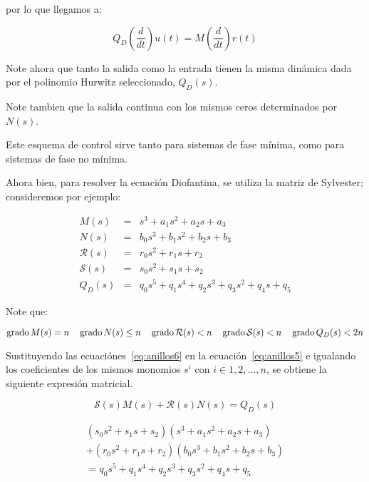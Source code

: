             por lo que llegamos a:

            \begin{equation}
                Q_D \left( \frac{d}{dt} \right) u(t) = M \left( \frac{d}{dt} \right) r(t)
            \end{equation}

            Note ahora que tanto la salida como la entrada tienen la misma dinámica dada por el polinomio Hurwitz seleccionado, $Q_D(s)$.

            Note tambien que la salida continua con los mismos ceros determinados por $N(s)$.

            Este esquema de control sirve tanto para sistemas de fase mínima, como para sistemas de fase no mínima.

            Ahora bien, para resolver la ecuación Diofantina, se utiliza la matriz de Sylvester; consideremos por ejemplo:

            \begin{eqnarray} \label{eq:anillos6}
                M(s) & = & s^3 + a_1 s^2 + a_2 s + a_3 \nonumber \\
                N(s) & = & b_0 s^3 + b_1 s^2 + b_2 s + b_3 \nonumber \\
                \mathcal{R}(s) & = & r_0 s^2 + r_1 s + r_2 \nonumber \\
                \mathcal{S}(s) & = & s_0 s^2 + s_1 s + s_2 \nonumber \\
                Q_D(s) & = & q_0 s^5 + q_1 s^4 + q_2 s^3 + q_3 s^2 + q_4 s + q_5
            \end{eqnarray}

            Note que:

            \begin{equation}
                \operatorname{grado}{M(s)} = n \quad \operatorname{grado}{N(s)} \le n \quad \operatorname{grado}{\mathcal{R}(s)} < n \quad \operatorname{grado}{\mathcal{S}(s)} < n \quad \operatorname{grado}{Q_D(s)} < 2n
            \end{equation}

            Sustituyendo las ecuaciónes~\ref{eq:anillos6} en la ecuación~\ref{eq:anillos5} e igualando los coeficientes de los mismos monomios $s^i$ con $i \in {1, 2, \dots, n}$, se obtiene la siguiente expresión matricial.

            \begin{equation*}
                \mathcal{S}(s) M(s) + \mathcal{R}(s) N(s) = Q_D(s)
            \end{equation*}

            \begin{multline*}
                (s_0 s^2 + s_1 s + s_2)(s^3 + a_1 s^2 + a_2 s + a_3) \\
                + (r_0 s^2 + r_1 s + r_2)(b_0 s^3 + b_1 s^2 + b_2 s + b_3) \\
                = q_0 s^5 + q_1 s^4 + q_2 s^3 + q_3 s^2 + q_4 s + q_5
            \end{multline*}
